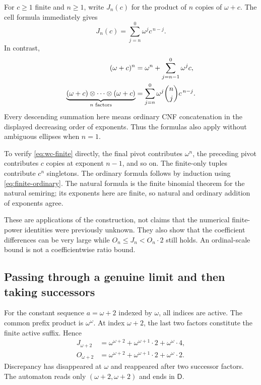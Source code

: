 \documentclass[11pt,letterpaper]{article}
\theoremstyle{definition}
\theoremstyle{remark}
\begin{document}
For $c\geq1$ finite and $n\geq1$, write $J_n(c)$ for the product of $n$
copies of $\omega+c$. The cell formula immediately gives
\begin{equation}\label{eq:wc-finite}
 J_n(c)=\sum_{j=n}^{0}\omega^j c^{\,n-j}.
\end{equation}
In contrast,
\begin{align}\label{eq:wc-ordinary-natural}
 (\omega+c)^n
    &=\omega^n+\sum_{j=n-1}^{0}\omega^j c,\notag\\
 \underbrace{(\omega+c)\otimes\cdots\otimes(\omega+c)}_{n\text{ factors}}
    &=\sum_{j=n}^{0}\omega^j\binom{n}{j}c^{\,n-j}.
\end{align}
Every descending summation here means ordinary CNF concatenation in
the displayed decreasing order of exponents. Thus the formulas also
apply without ambiguous ellipses when $n=1$.

To verify \eqref{eq:wc-finite} directly, the final pivot contributes
$\omega^n$, the preceding pivot contributes $c$ copies at exponent
$n-1$, and so on. The finite-only tuples contribute $c^n$ singletons.
The ordinary formula follows by induction using
\eqref{eq:finite-ordinary}. The natural formula is the finite binomial
theorem for the natural semiring; its exponents here are finite, so
natural and ordinary addition of exponents agree.

These are applications of the construction, not claims that the
numerical finite-power identities were previously unknown. They also
show that the coefficient differences can be very large while
$O_n\leq J_n<O_n\cdot2$ still holds. An ordinal-scale bound is not a
coefficientwise ratio bound.

\subsection{Passing through a genuine limit and then taking successors}

For the constant sequence $a=\omega+2$ indexed by $\omega$, all indices
are active. The common prefix product is $\omega^\omega$. At index
$\omega+2$, the last two factors constitute the finite active suffix.
Hence
\begin{align*}
 J_{\omega+2}
 &=\omega^{\omega+2}+\omega^{\omega+1}\cdot2+\omega^\omega\cdot4,\\
 O_{\omega+2}
 &=\omega^{\omega+2}+\omega^{\omega+1}\cdot2+\omega^\omega\cdot2.
\end{align*}
Discrepancy has disappeared at $\omega$ and reappeared after two successor
factors. The automaton reads only $(\omega+2,\omega+2)$ and ends in
$\mathsf D$.
\end{document}

